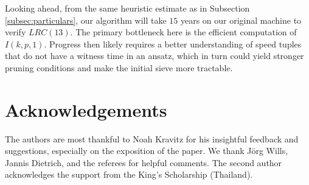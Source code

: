 \documentclass[11pt]{amsart}
\theoremstyle{definition}
\theoremstyle{remark}
\begin{document}
Looking ahead, from the same heuristic estimate as in Subsection \ref{subsec:particulars}, our algorithm will take $15$ years on our original machine to verify $LRC(13)$. 
The primary bottleneck here is the efficient computation of $I(k, p, 1)$. 
Progress then likely requires a better understanding of speed tuples that do not have a witness time in an ansatz, 
which in turn could yield stronger pruning conditions and make the initial sieve more tractable. 

\section*{Acknowledgements}
The authors are most thankful to Noah Kravitz for his insightful feedback and suggestions, 
especially on the exposition of the paper. We thank Jörg Wills, Jannis Dietrich, and the referees for helpful comments.
The second author acknowledges the support from the King's Scholarship (Thailand).



\end{document}

